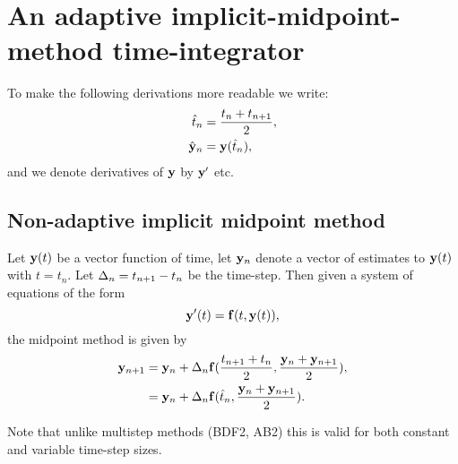 \newcommand{\porder}[1]{\quad + \order{#1}}
\newcommand{\dfdyhfx}[1]{\hat{\dfdy_{#1}}}
\newcommand{\dfdyhf}{\dfdyhfx{n}}

\section{An adaptive implicit-midpoint-method time-integrator}









To make the following derivations more readable we write:
\begin{align}
  \thf &= \frac{t_n + t_{n+1}}{2}, \notag\\
  \yvhf &= \yv(\thf), %
\end{align}
and we denote derivatives of $\mathbf{y}$ by $\mathbf{y}'$ etc.


\subsection{Non-adaptive implicit midpoint method}

Let $\mathbf{y}(t)$ be a vector function of time, let $\mathbf{y}_n$ denote a vector of estimates to $\mathbf{y}(t)$ with $t = t_n$.
Let $\Delta_{n} = t_{n+1} - t_n$ be the time-step.
Then given a system of equations of the form
\begin{equation}
  \mathbf{y}'(t) = {\mathbf{f}}(t, \mathbf{y}(t)),
  \label{eq:43}
\end{equation}
the midpoint method is given by
\begin{align}
  \mathbf{y}_{n+1} &= \mathbf{y}_n + \Delta_{n} {\mathbf{f}}(\frac{t_{n+1} + t_n}{2}, \frac{\mathbf{y}_n + \mathbf{y}_{n+1}}{2}), \notag\\
  &= \mathbf{y}_n + \Delta_{n} {\mathbf{f}}(\hat{t}_{n}, \frac{\mathbf{y}_n + \mathbf{y}_{n+1}}{2}).
  \label{eq:basic-midpoint}
\end{align}

Note that unlike multistep methods (\eg BDF2, AB2) this is valid for both constant and variable time-step sizes.



